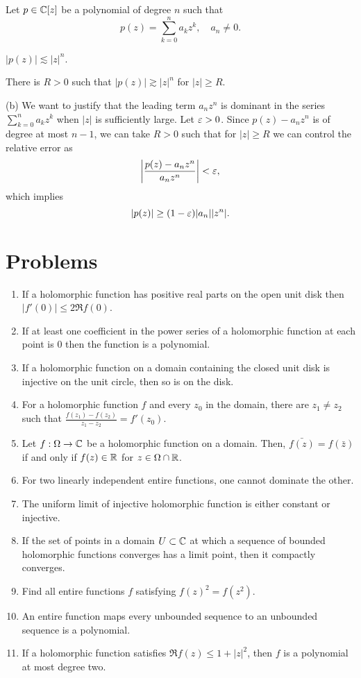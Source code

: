 \documentclass{../../large}
\begin{document}
\begin{prb}
Let $p\in\mathbb{C}[z]$ be a polynomial of degree $n$ such that
\[p(z)=\sum_{k=0}^na_kz^k,\quad a_n\ne0.\]
\begin{parts}
\item $|p(z)|\lesssim|z|^n$.
\item There is $R>0$ such that $|p(z)|\gtrsim|z|^n$ for $|z|\ge R$.
\end{parts}
\end{prb}
\begin{pf}
(b)
We want to justify that the leading term $a_nz^n$ is dominant in the series $\sum_{k=0}^na_kz^k$ when $|z|$ is sufficiently large.
Let $\varepsilon>0$.
Since $p(z)-a_nz^n$ is of degree at most $n-1$, we can take $R>0$ such that for $|z|\ge R$ we can control the relative error as
\[\left|\frac{p(z)-a_nz^n}{a_nz^n}\right|<\varepsilon,\]
which implies
\[|p(z)|\ge(1-\varepsilon)|a_n||z^n|.\]
\end{pf}


\section*{Problems}

\begin{enumerate}
\item If a holomorphic function has positive real parts on the open unit disk then $|f'(0)|\le2\Re f(0)$.
\item If at least one coefficient in the power series of a holomorphic function at each point is 0 then the function is a polynomial.
\item If a holomorphic function on a domain containing the closed unit disk is injective on the unit circle, then so is on the disk.
\item For a holomorphic function $f$ and every $z_0$ in the domain, there are $z_1\ne z_2$ such that $\frac{f(z_1)-f(z_2)}{z_1-z_2}=f'(z_0)$.
\item Let $f:\Omega\to\mathbb{C}$ be a holomorphic function on a domain. Then, $\bar{f(z)}=f(\bar z)$ if and only if $f(z)\in\mathbb{R}$ for $z\in\Omega\cap\mathbb{R}$.
\item For two linearly independent entire functions, one cannot dominate the other.
\item The uniform limit of injective holomorphic function is either constant or injective.
\item If the set of points in a domain $U\subset\mathbb{C}$ at which a sequence of bounded holomorphic functions converges has a limit point, then it compactly converges.
\item Find all entire functions $f$ satisfying $f(z)^2=f(z^2)$.
\item An entire function maps every unbounded sequence to an unbounded sequence is a polynomial.
\item If a holomorphic function satisfies $\Re f(z)\le1+|z|^2$, then $f$ is a polynomial at most degree two.
\end{enumerate}
\end{document}
